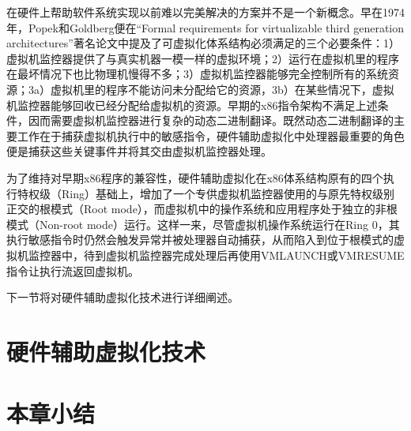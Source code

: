 在硬件上帮助软件系统实现以前难以完美解决的方案并不是一个新概念。早在1974年，Popek和Goldberg便在``Formal requirements for virtualizable third generation architectures''著名论文中提及了可虚拟化体系结构必须满足的三个必要条件：1）虚拟机监控器提供了与真实机器一模一样的虚拟环境；2）运行在虚拟机里的程序在最坏情况下也比物理机慢得不多；3）虚拟机监控器能够完全控制所有的系统资源；3a）虚拟机里的程序不能访问未分配给它的资源，3b）在某些情况下，虚拟机监控器能够回收已经分配给虚拟机的资源。早期的x86指令架构不满足上述条件，因而需要虚拟机监控器进行复杂的动态二进制翻译。既然动态二进制翻译的主要工作在于捕获虚拟机执行中的敏感指令，硬件辅助虚拟化中处理器最重要的角色便是捕获这些关键事件并将其交由虚拟机监控器处理。

为了维持对早期x86程序的兼容性，硬件辅助虚拟化在x86体系结构原有的四个执行特权级（Ring）基础上，增加了一个专供虚拟机监控器使用的与原先特权级别正交的根模式（Root mode），而虚拟机中的操作系统和应用程序处于独立的非根模式（Non-root mode）运行。这样一来，尽管虚拟机操作系统运行在Ring 0，其执行敏感指令时仍然会触发异常并被处理器自动捕获，从而陷入到位于根模式的虚拟机监控器中，待到虚拟机监控器完成处理后再使用VMLAUNCH或VMRESUME指令让执行流返回虚拟机。

下一节将对硬件辅助虚拟化技术进行详细阐述。

\section{硬件辅助虚拟化技术}

\subsection{}

\section{本章小结}

